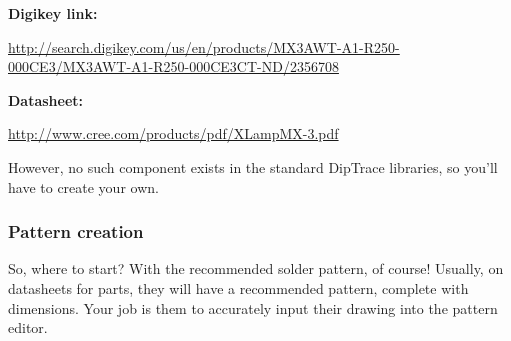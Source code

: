 \documentclass[letterpaper]{article}
\begin{document}
{\sffamily\bfseries\color[rgb]{0.30980393,0.5058824,0.7411765}
Digikey link:}

{\sffamily\color[rgb]{0.30980393,0.5058824,0.7411765}
\url{http://search.digikey.com/us/en/products/MX3AWT-A1-R250-000CE3/MX3AWT-A1-R250-000CE3CT-ND/2356708}}

{\sffamily\bfseries\color[rgb]{0.30980393,0.5058824,0.7411765}
Datasheet:}

{\sffamily\color[rgb]{0.30980393,0.5058824,0.7411765}
\url{http://www.cree.com/products/pdf/XLampMX-3.pdf}}


\bigskip

{\sffamily\color[rgb]{0.30980393,0.5058824,0.7411765}
However, no such component exists in the standard DipTrace libraries, so you'll have to create your own.}

\subsubsection{Pattern creation}
\hypertarget{Toc337742703}{}{\sffamily\color[rgb]{0.30980393,0.5058824,0.7411765}
So, where to start? With the recommended solder pattern, of course! Usually, on datasheets for parts, they will have a
recommended pattern, complete with dimensions. Your job is them to accurately input their drawing into the pattern
editor.}


\bigskip
\end{document}
